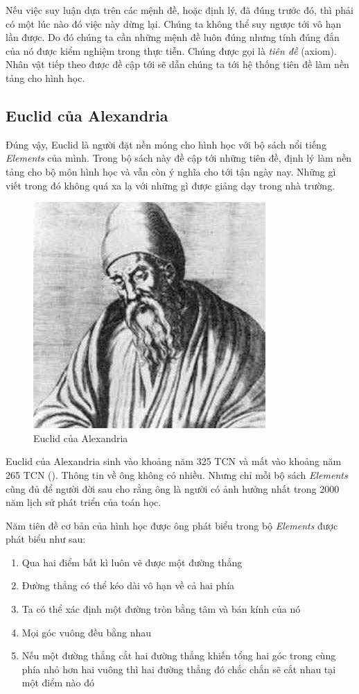 Nếu việc suy luận dựa trên các mệnh đề, hoặc định lý, đã đúng trước đó, thì phải có một lúc nào đó việc này dừng lại. Chúng ta không thể suy ngược tới vô hạn lần được. Do đó chúng ta cần những mệnh đề luôn đúng nhưng tính đúng đắn của nó được kiểm nghiệm trong thực tiễn. Chúng được gọi là \textit{tiên đề} (axiom). Nhân vật tiếp theo được đề cập tới sẽ dẫn chúng ta tới hệ thống tiên đề làm nền tảng cho hình học.

\subsection{Euclid của Alexandria}

Đúng vậy, Euclid là người đặt nền móng cho hình học với bộ sách nổi tiếng \textit{Elements} của mình. Trong bộ sách này đề cập tới những tiên đề, định lý làm nền tảng cho bộ môn hình học và vẫn còn ý nghĩa cho tới tận ngày nay. Những gì viết trong đó không quá xa lạ với những gì được giảng dạy trong nhà trường.

\begin{figure}[ht]
	\centering
	\includegraphics[scale=0.5]{analytic_geometry/Euclid.jpeg}
	\caption{Euclid của Alexandria}
\end{figure}

Euclid của Alexandria sinh vào khoảng năm 325 TCN và mất vào khoảng năm 265 TCN (\cite{MacTutorEuclid}). Thông tin về ông không có nhiều. Nhưng chỉ mỗi bộ sách \textit{Elements} cũng đủ để người đời sau cho rằng ông là người có ảnh hưởng nhất trong 2000 năm lịch sử phát triển của toán học.

Năm tiên đề cơ bản của hình học được ông phát biểu trong bộ \textit{Elements} được phát biểu như sau:

\begin{enumerate}
	\item Qua hai điểm bất kì luôn vẽ được một đường thẳng
	\item Đường thẳng có thể kéo dài vô hạn về cả hai phía
	\item Ta có thể xác định một đường tròn bằng tâm và bán kính của nó
	\item Mọi góc vuông đều bằng nhau
	\item Nếu một đường thẳng cắt hai đường thẳng khiến tổng hai góc trong cùng phía nhỏ hơn hai vuông thì hai đường thẳng đó chắc chắn sẽ cắt nhau tại một điểm nào đó
\end{enumerate}

